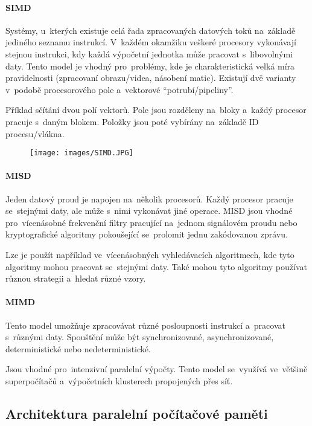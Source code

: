 \paragraph{SIMD}

Systémy, u~kterých existuje celá řada zpracovaných datových toků na~základě jediného seznamu instrukcí. V~každém okamžiku veškeré procesory vykonávají stejnou instrukci, kdy každá výpočetní jednotka může pracovat s~libovolnými daty. Tento model je vhodný pro~problémy, kde je charakteristická velká míra pravidelnosti (zpracovaní obrazu/videa, násobení matic). Existují dvě varianty v~podobě procesorového pole a~vektorové \enquote{potrubí/pipeliny}.

Příklad sčítání dvou polí vektorů. Pole jsou rozděleny na~bloky a~každý procesor pracuje s~daným blokem. Položky jsou poté vybírány na~základě ID procesu/vlákna.

\begin{figure}[ht]
	\centering
	\texttt{[image: images/SIMD.JPG]}
\end{figure}

\paragraph{MISD}

Jeden datový proud je napojen na~několik procesorů. Každý procesor pracuje se~stejnými daty, ale může s~nimi vykonávat jiné operace. MISD jsou vhodné pro~vícenásobné frekvenční filtry pracující na~jednom signálovém proudu nebo kryptografické algoritmy pokoušející se~prolomit jednu zakódovanou zprávu.

Lze je použít například ve~vícenásobných vyhledávacích algoritmech, kde tyto algoritmy mohou pracovat se~stejnými daty. Také mohou tyto algoritmy používat různou strategii a~hledat různé vzory.

\paragraph{MIMD}

Tento model umožňuje zpracovávat různé posloupnosti instrukcí a~pracovat s~různými daty. Spouštění může být synchronizované, asynchronizované, deterministické nebo nedeterministické.

Jsou vhodné pro~intenzivní paralelní výpočty. Tento model se~využívá ve~většině superpočítačů a~výpočetních klusterech propojených přes síť.

\subsection{Architektura paralelní počítačové paměti}

